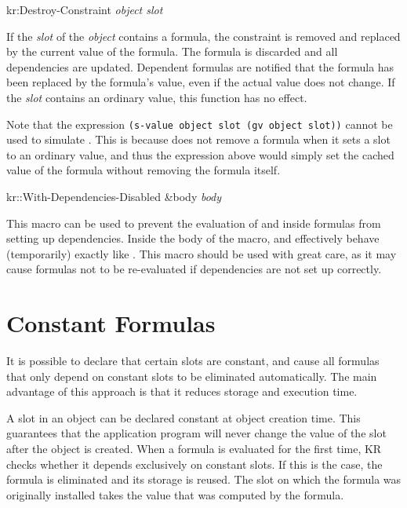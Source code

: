 \value{f-top}
\begin{example}
kr:Destroy-Constraint {\it object slot}\value{function}
\end{example}

If the {\it slot} of the {\it object} contains a formula, the constraint is
removed and replaced by the current value of the formula.  The formula is
discarded and all dependencies are updated.  Dependent formulas are notified
that the formula has been replaced by the formula's value, even if the actual
value does not change.  If the {\it slot} contains an ordinary value, this
function has no effect.

Note that the expression {\tt (s-value object slot (gv object slot))}
cannot be used to simulate .  This is because
 does not remove a formula when it sets a slot to an ordinary
value, and thus the expression above would simply set the cached value of
the formula without removing the formula itself.


\value{f-top}
\begin{example}
kr::With-Dependencies-Disabled \&body {\it body} \value{macro}
\end{example}
This macro can be used to prevent the evaluation of  and  inside
formulas from setting up dependencies.  Inside the body of the macro, 
and 
effectively behave (temporarily) exactly like .
This macro should be used with great care, as it may cause formulas
not to be re-evaluated if dependencies are not set up correctly.



\section{Constant Formulas}
\value{s-top}
\label{constant-slots}
It is possible to declare that certain slots are constant, and
cause all formulas that only depend on constant slots to be
eliminated automatically.  The main advantage of this approach is
that it reduces storage and execution time.

A slot in an object can be declared constant at object creation time.
This guarantees that the application program will never change the
value of the slot after the object is created.  When a formula is
evaluated for the first time, KR checks whether it depends exclusively
on constant slots.  If this is the case, the formula is eliminated and
its storage is reused.  The slot on which the formula was originally
installed takes the value that was computed by the formula.

